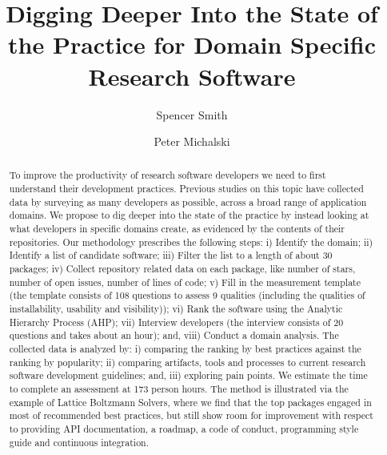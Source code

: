 \documentclass[runningheads]{llncs}
\begin{document}
%
\title{Digging Deeper Into the State of the Practice for Domain Specific Research Software}
%
\author{Spencer Smith \and
Peter Michalski}%
%
%
%
\maketitle %
%
\begin{abstract}

	To improve the productivity of research software developers we need to first
	understand their development practices.  Previous studies on this topic have
	collected data by surveying as many developers as possible, across a broad
	range of application domains.  We propose to dig deeper into the state of
	the practice by instead looking at what developers in specific domains
	create, as evidenced by the contents of their repositories.  Our methodology
	prescribes the following steps: i) Identify the domain; ii) Identify a list
	of candidate software; iii) Filter the list to a length of about 30
	packages; iv) Collect repository related data on each package, like number
	of stars, number of open issues, number of lines of code; v) Fill in the
	measurement template (the template consists of 108 questions to assess 9
	qualities (including the qualities of installability, usability and
	visibility)); vi) Rank the software using the Analytic Hierarchy Process
	(AHP); vii) Interview developers (the interview consists of 20 questions and
	takes about an hour); and, viii) Conduct a domain analysis. The collected
	data is analyzed by: i) comparing the ranking by best practices against the
	ranking by popularity; ii) comparing artifacts, tools and processes to
	current research software development guidelines; and, iii) exploring pain
	points. We estimate the time to complete an assessment at 173 person hours.
	The method is illustrated via the example of Lattice Boltzmann Solvers,
	where we find that the top packages engaged in most of recommended best
	practices, but still show room for improvement with respect to providing API
	documentation, a roadmap, a code of conduct, programming style guide and
	continuous integration.


\end{abstract}
\end{document}
